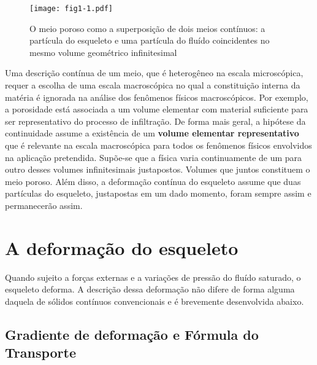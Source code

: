 \documentclass[
	11pt, %
	fleqn, %
	a4paper, %
]{LegrandOrangeBook}
\begin{document}
\begin{figure}[H] %
	\centering %
	\texttt{[image: fig1-1.pdf]} %
	\caption{O meio poroso como a superposição de dois meios contínuos: a partícula do esqueleto e uma partícula do fluído coincidentes no mesmo volume geométrico infinitesimal}
	\label{fig:fig1-1.pdf} %
\end{figure}

Uma descrição contínua de um meio, que é heterogêneo na escala microscópica, requer a escolha de uma escala macroscópica no qual a constituição interna da matéria é ignorada na análise dos fenômenos físicos macroscópicos. Por exemplo, a porosidade está associada a um volume elementar com material suficiente para ser representativo do processo de infiltração. De forma mais geral, a hipótese da continuidade assume a existência de um \textbf{volume elementar representativo} que é relevante na escala macroscópica para todos os fenômenos físicos envolvidos na aplicação pretendida. Supõe-se que a física varia continuamente de um para outro desses volumes infinitesimais justapostos. Volumes que juntos constituem o meio poroso. Além disso, a deformação contínua do esqueleto assume que duas partículas do esqueleto, justapostas em um dado momento, foram sempre assim e permanecerão assim. 

\section{A deformação do esqueleto}

Quando sujeito a forças externas e a variações de pressão do fluído saturado, o esqueleto deforma. A descrição dessa deformação não difere de forma alguma daquela de sólidos contínuos convencionais e é brevemente desenvolvida abaixo.



\subsection{Gradiente de deformação e Fórmula do Transporte}


\newcommand{\Fll}{\textbf{F}}
\newcommand{\Ml}{\textbf{M}}
\newcommand{\Nl}{\textbf{N}}
\newcommand{\Cl}{\textbf{C}}
\newcommand{\nl}{\textbf{n}}
\newcommand{\dl}{\textbf{d}}
\newcommand{\Rll}{\textbf{R}}
\newcommand{\Tll}{\textbf{T}}
\newcommand{\Dll}{\textbf{D}}
\newcommand{\Ul}{\textbf{U}}
\newcommand{\Xl}{\textbf{X}}
\newcommand{\Yl}{\textbf{Y}}
\newcommand{\wl}{\textbf{w}}
\newcommand{\Xil}{\bm{\xi}}
\newcommand{\strainll}{\bm{\varepsilon}}
\newcommand{\Omegall}{\bm{\Omega}}
\newcommand{\omegal}{\bm{\omega}}
\newcommand{\gammal}{\bm{\gamma}}
\newcommand{\xl}{\textbf{x}}
\newcommand{\yl}{\textbf{y}}
\newcommand{\el}{\textbf{e}}
\newcommand{\onell}{\bm{1}}
\newcommand{\vl}{\textbf{v}}
\newcommand{\Vl}{\textbf{V}}
\newcommand{\Deltall}{\bm{\Delta}}
\end{document}
